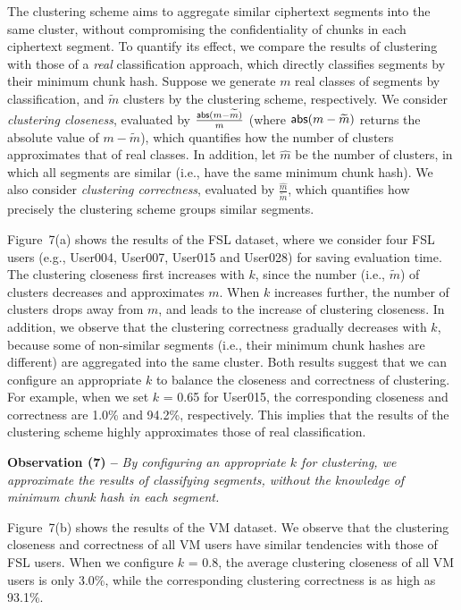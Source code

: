 The clustering scheme aims to aggregate similar ciphertext segments into the
same cluster, without compromising the confidentiality of chunks in each
ciphertext segment.  To quantify its effect, we compare the results of
clustering with those of a {\em real} classification approach, which directly
classifies segments by their minimum chunk hash.  Suppose we generate $m$ real
classes of segments by classification, and $\widetilde{m}$ clusters by the
clustering scheme, respectively.  We consider {\em clustering closeness},
evaluated by $\frac{{\sf abs}(m-\widetilde{m})}{m}$ (where 
${\sf abs}(m-\widetilde{m})$ returns the absolute value of $m-\widetilde{m}$),
which quantifies how the  number of clusters approximates that of real
classes. In addition, let $\hat{m}$ be the number of clusters, in which all
segments are similar (i.e., have the same minimum chunk hash). We also
consider {\em clustering correctness}, evaluated by
$\frac{\hat{m}}{\widetilde{m}}$, which quantifies how precisely the clustering
scheme groups similar segments.  

Figure~7(a) shows the results of the FSL dataset, where we
consider four FSL users (e.g., User004, User007, User015 and User028) for
saving evaluation time. The clustering closeness first increases with $k$,
since the number (i.e., $\widetilde{m}$) of clusters decreases and
approximates $m$. When $k$ increases further, the number of clusters drops
away from $m$, and leads to the increase of clustering closeness.  In
addition, we observe that the clustering correctness gradually decreases with
$k$, because some of non-similar segments (i.e., their minimum chunk hashes are
different) are aggregated into the same cluster. Both results suggest that we
can configure an appropriate $k$ to balance the closeness and correctness of
clustering. For example, when we set $k$ = 0.65 for User015, the corresponding
closeness and correctness are 1.0\% and 94.2\%, respectively. This implies
that the results of the clustering scheme  highly approximates
those of real classification.             

{\bf Observation (7) --} {\em By configuring an appropriate $k$ for
clustering, we  approximate the results of  classifying segments, without the knowledge of  minimum chunk hash in each
segment.}   

Figure~7(b) shows the results of the VM dataset. We observe
that the clustering closeness and correctness of all VM users have  similar
tendencies with those of FSL users. When we configure $k$ = 0.8, the average
clustering closeness of all VM users is only 3.0\%, while the corresponding
clustering correctness is as high as 93.1\%.     



